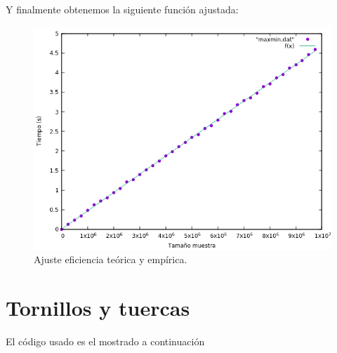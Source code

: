 Y finalmente obtenemos la siguiente función ajustada:
\begin{figure}[H]
    \begin{center}
        \includegraphics[scale=0.7]{imagenes/mm_adj.png}
        \caption{Ajuste eficiencia teórica y empírica.}
        \label{fig3}
    \end{center}
\end{figure}




\section{Tornillos y tuercas}

El código usado es el mostrado a continuación

